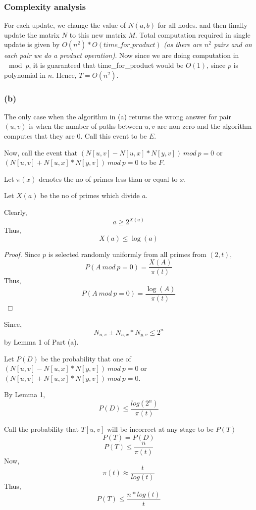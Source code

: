 \documentclass[a4paper]{article}
\begin{document}
\subsubsection*{Complexity analysis}
For each update, we change the value of $N(a,b)$ for all nodes. and then finally update the matrix $N$ to this new
matrix $M$. Total computation required in single update is given by $O(n^2) * O(time\_for\_product)$ \textit{(as 
there are $n^2$ pairs and on each pair we do a product operation)}. Now since
we are doing computation in $\mod p$, it is guaranteed that time\_for\_product would be $O(1)$, since $p$ is polynomial in $n$.
Hence, $T = O(n^2)$. 

\subsubsection*{(b)}

The only case when the algorithm in (a) returns the wrong answer for pair $(u,v)$ is when the number of paths between $u,v$ are non-zero and the algorithm computes that they are $0$. Call this event to be $E$.

Now, call the event that $(N[u,v] - N[u,x]*N[y,v])\ mod\ p = 0$ or $(N[u,v] + N[u,x]*N[y,v])\ mod\ p = 0$ to be $F$.

Let $\pi(x)$ denotes the no of primes less than or equal to $x$.

Let $X(a)$ be the no of primes which divide $a$.

Clearly, $$a \geq 2^{X(a)}$$
Thus, $$X(a) \leq \log(a)$$
\begin{warn}[Lemma 1: Probability that $A\ mod\ p = 0$ when $p$ is a random prime no from $(2,t)$ is less than or equal to $\frac{log(A}{\pi(t)}$.]
\end{warn}

\begin{proof}
Since $p$ is selected randomly uniformly from all primes from $(2,t)$,
$$P(A\ mod\ p = 0) = \frac{X(A)}{\pi(t)}$$
Thus, 
$$P(A\ mod\ p = 0) = \frac{\log (A)}{\pi(t)}$$
\end{proof}

Since, $$N_{u,v} \pm N_{u,x}*N_{y,v} \leq 2^n$$ by Lemma 1 of Part (a).

Let $P(D)$ be the probability that one of $(N[u,v] - N[u,x]*N[y,v])\ mod\ p = 0$ or $(N[u,v] + N[u,x]*N[y,v])\ mod\ p = 0$.

By Lemma 1,
$$P(D) \leq \frac{log(2^n)}{\pi(t)}$$ 

Call the probability that $T[u,v]$ will be incorrect at any stage to be $P(T)$
$$P(T) = P(D)$$
$$P(T) \leq \frac{n}{\pi(t)}$$
Now,
$$\pi(t) \approx \frac{t}{log(t)}$$
Thus, $$P(T) \leq \frac{n*log(t)}{t}$$
\end{document}
